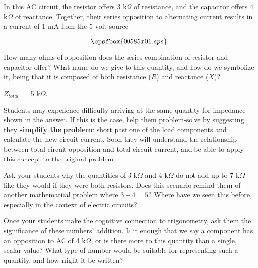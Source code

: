 

In this AC circuit, the resistor offers 3 k$\Omega$ of resistance, and the capacitor offers 4 k$\Omega$ of reactance.  Together, their series opposition to alternating current results in a current of 1 mA from the 5 volt source:

$$\epsfbox{00585x01.eps}$$

How many ohms of opposition does the series combination of resistor and capacitor offer?  What name do we give to this quantity, and how do we symbolize it, being that it is composed of both resistance ($R$) and reactance ($X$)?







$Z_{total} =$ 5 k$\Omega$.







Students may experience difficulty arriving at the same quantity for impedance shown in the answer.  If this is the case, help them problem-solve by suggesting they {\bf simplify the problem}: short past one of the load components and calculate the new circuit current.  Soon they will understand the relationship between total circuit opposition and total circuit current, and be able to apply this concept to the original problem.

Ask your students why the quantities of 3 k$\Omega$ and 4 k$\Omega$ do not add up to 7 k$\Omega$ like they would if they were both resistors.  Does this scenario remind them of another mathematical problem where $3 + 4 = 5$?  Where have we seen this before, especially in the context of electric circuits?

Once your students make the cognitive connection to trigonometry, ask them the significance of these numbers' addition.  Is it enough that we say a component has an opposition to AC of 4 k$\Omega$, or is there more to this quantity than a single, scalar value?  What type of number would be suitable for representing such a quantity, and how might it be written?




